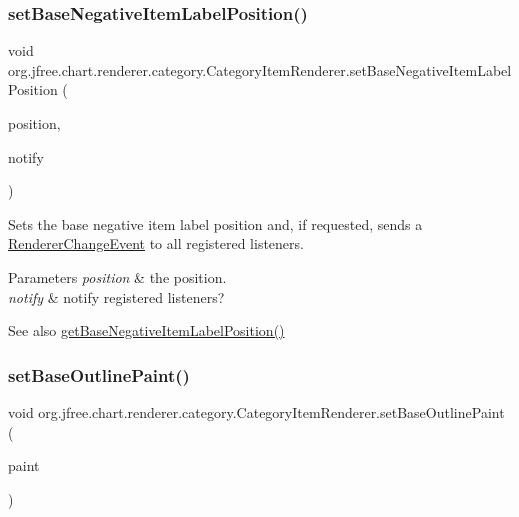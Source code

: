 \subsubsection{\texorpdfstring{set\+Base\+Negative\+Item\+Label\+Position()}{setBaseNegativeItemLabelPosition()}\hspace{0.1cm}{\footnotesize\ttfamily [2/2]}}
{\footnotesize\ttfamily void org.\+jfree.\+chart.\+renderer.\+category.\+Category\+Item\+Renderer.\+set\+Base\+Negative\+Item\+Label\+Position (\begin{DoxyParamCaption}\item[{\mbox{\hyperlink{classorg_1_1jfree_1_1chart_1_1labels_1_1_item_label_position}{Item\+Label\+Position}}}]{position,  }\item[{boolean}]{notify }\end{DoxyParamCaption})}

Sets the base negative item label position and, if requested, sends a \mbox{\hyperlink{}{Renderer\+Change\+Event}} to all registered listeners.


\begin{DoxyParams}{Parameters}
{\em position} & the position. \\
\hline
{\em notify} & notify registered listeners?\\
\hline
\end{DoxyParams}
\begin{DoxySeeAlso}{See also}
\mbox{\hyperlink{interfaceorg_1_1jfree_1_1chart_1_1renderer_1_1category_1_1_category_item_renderer_a07449f382743d7ef7196b59f592c2b80}{get\+Base\+Negative\+Item\+Label\+Position()}} 
\end{DoxySeeAlso}
\mbox{\label{interfaceorg_1_1jfree_1_1chart_1_1renderer_1_1category_1_1_category_item_renderer_a93943e70bb3fe40e631bcc25ac9201d7}} 
\subsubsection{\texorpdfstring{set\+Base\+Outline\+Paint()}{setBaseOutlinePaint()}}
{\footnotesize\ttfamily void org.\+jfree.\+chart.\+renderer.\+category.\+Category\+Item\+Renderer.\+set\+Base\+Outline\+Paint (\begin{DoxyParamCaption}\item[{Paint}]{paint }\end{DoxyParamCaption})}

